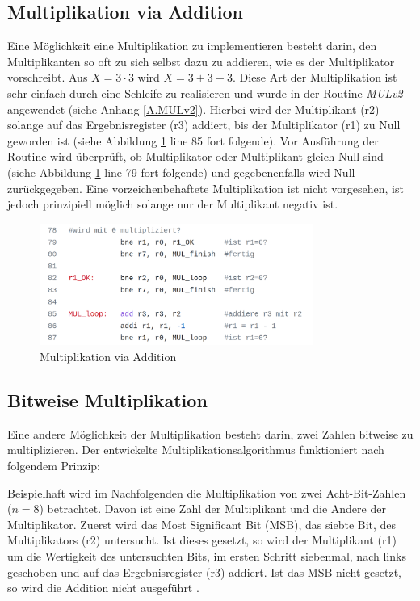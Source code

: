 \documentclass[fleqn, a4paper, 11pt]{article}       %
\begin{document}
\subsection{Multiplikation via Addition}
Eine Möglichkeit eine Multiplikation zu implementieren besteht darin, den Multiplikanten so oft zu sich selbst dazu zu addieren, wie es der Multiplikator vorschreibt. Aus $X = 3 \cdot 3$ wird  $X = 3+3+3$. Diese Art der Multiplikation ist sehr einfach durch eine Schleife zu realisieren und wurde in der Routine \emph{MULv2} angewendet (siehe Anhang \ref{A.MULv2}). Hierbei wird der Multiplikant (r2) solange auf das Ergebnisregister (r3) addiert, bis der Multiplikator (r1) zu Null geworden ist (siehe Abbildung \ref{fig:MULv2_code} line 85 fort folgende). Vor Ausführung der Routine wird überprüft, ob Multiplikator oder Multiplikant gleich Null sind (siehe Abbildung \ref{fig:MULv2_code} line 79 fort folgende) und gegebenenfalls wird Null zurückgegeben. Eine vorzeichenbehaftete Multiplikation ist nicht vorgesehen, ist jedoch prinzipiell möglich solange nur der Multiplikant negativ ist.

\begin{figure}[h]
    \includegraphics[width =0.8\textwidth]{MULv2_code.png}
\caption{Multiplikation via Addition}
\label{fig:MULv2_code}
\end{figure}

\subsection{Bitweise Multiplikation}
Eine andere Möglichkeit der Multiplikation besteht darin, zwei Zahlen bitweise zu multiplizieren. Der entwickelte Multiplikationsalgorithmus funktioniert nach folgendem Prinzip: 

Beispielhaft wird im Nachfolgenden die Multiplikation von zwei Acht-Bit-Zahlen \\ ($n = 8$) betrachtet. Davon ist eine Zahl der Multiplikant und die Andere der Multiplikator. Zuerst wird das Most Significant Bit (MSB), das siebte Bit, des Multiplikators (r2) untersucht. Ist dieses gesetzt, so wird der Multiplikant (r1) um die Wertigkeit des untersuchten Bits, im ersten Schritt siebenmal, nach links geschoben und auf das Ergebnisregister (r3) addiert. Ist das MSB nicht gesetzt, so wird die Addition nicht ausgeführt \cite{MULv3}. \\
\end{document}
